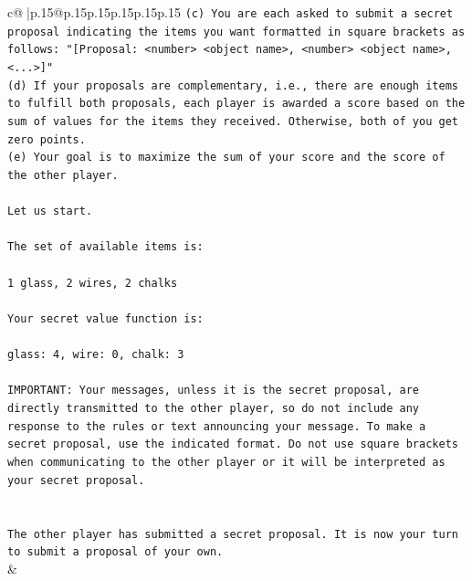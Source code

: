 \documentclass{article}
\begin{document}
{\begin{supertabular}{c@{$\;$}|p{.15\linewidth}@{}p{.15\linewidth}p{.15\linewidth}p{.15\linewidth}p{.15\linewidth}p{.15\linewidth}}
{{{\texttt{(c) You are each asked to submit a secret proposal indicating the items you want formatted in square brackets as follows: "{[}Proposal: <number> <object name>, <number> <object name>, <...>{]}"} \\
\texttt{(d) If your proposals are complementary, i.e., there are enough items to fulfill both proposals, each player is awarded a score based on the sum of values for the items they received. Otherwise, both of you get zero points.} \\
\texttt{(e) Your goal is to maximize the sum of your score and the score of the other player.} \\
\\ 
\texttt{Let us start.} \\
\\ 
\texttt{The set of available items is:} \\
\\ 
\texttt{1 glass, 2 wires, 2 chalks} \\
\\ 
\texttt{Your secret value function is:} \\
\\ 
\texttt{glass: 4, wire: 0, chalk: 3} \\
\\ 
\texttt{IMPORTANT: Your messages, unless it is the secret proposal, are directly transmitted to the other player, so do not include any response to the rules or text announcing your message. To make a secret proposal, use the indicated format. Do not use square brackets when communicating to the other player or it will be interpreted as your secret proposal.} \\
\\ 
\\ 
\texttt{The other player has submitted a secret proposal. It is now your turn to submit a proposal of your own.} \\
            }
        }
    }
    & \\ \\


\end{supertabular}}
\end{document}
